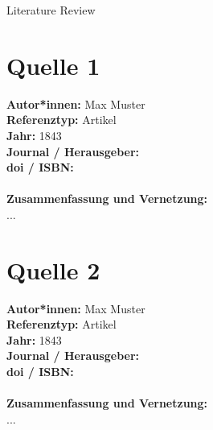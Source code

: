 \documentclass{report}
\begin{document}
{\LARGE Literature Review}


{\let\clearpage\relax \chapter{Quelle 1}}
\noindent
\textbf{Autor*innen:} Max Muster\\
\textbf{Referenztyp:} Artikel\\
\textbf{Jahr:} 1843\\
\textbf{Journal / Herausgeber:}\\
\textbf{doi / ISBN:}\\\\
\textbf{Zusammenfassung und Vernetzung:}\\
...\\


{\let\clearpage\relax \chapter{Quelle 2}}
\noindent
\textbf{Autor*innen:} Max Muster\\
\textbf{Referenztyp:} Artikel\\
\textbf{Jahr:} 1843\\
\textbf{Journal / Herausgeber:}\\
\textbf{doi / ISBN:}\\\\
\textbf{Zusammenfassung und Vernetzung:}\\
...\\

\end{document}
